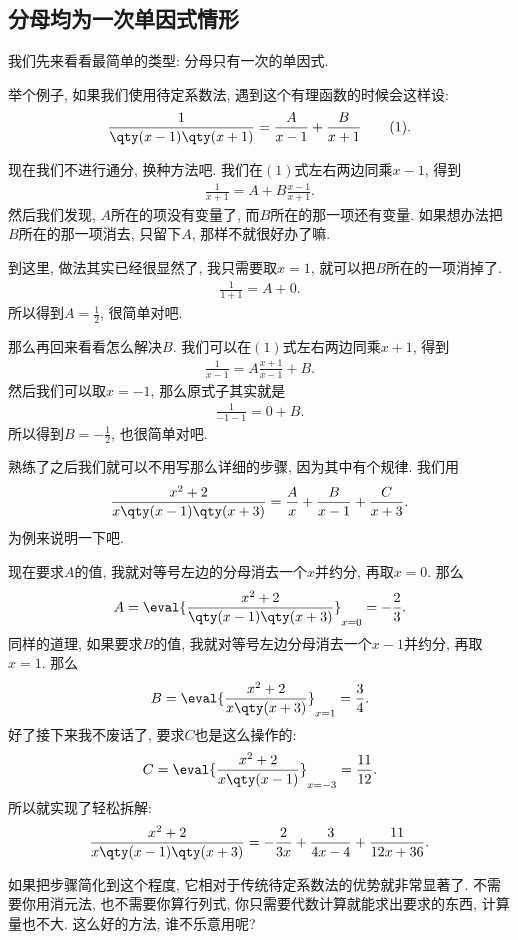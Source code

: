 \documentclass{ctexbook}
\begin{document}
{\subsection{分母均为一次单因式情形}
我们先来看看最简单的类型: 分母只有一次的单因式. \par
举个例子, 如果我们使用待定系数法, 遇到这个有理函数的时候会这样设: 
\begin{align*}
\frac{1}{\qty(x-1)\qty(x+1)}=\frac{A}{x-1}+\frac{B}{x+1}\tag{1}
.\end{align*}\par
现在我们不进行通分, 换种方法吧. 我们在$(1)$式左右两边同乘$x-1$, 得到
\begin{align*}
\frac{1}{x+1}=A+B\frac{x-1}{x+1}
.\end{align*}
然后我们发现, $A$所在的项没有变量了, 而$B$所在的那一项还有变量. 如果想办法把$B$所在的那一项消去, 只留下$A$, 那样不就很好办了嘛. \par
到这里, 做法其实已经很显然了, 我只需要取$x=1$, 就可以把$B$所在的一项消掉了. 
\begin{align*}
\frac{1}{1+1}=A+0
.\end{align*}
所以得到$A=\frac{1}{2}$, 很简单对吧. \par
那么再回来看看怎么解决$B$. 我们可以在$(1)$式左右两边同乘$x+1$, 得到
\begin{align*}
\frac{1}{x-1}=A\frac{x+1}{x-1}+B
.\end{align*}
然后我们可以取$x=-1$, 那么原式子其实就是
\begin{align*}
\frac{1}{-1-1}=0+B
.\end{align*}
所以得到$B=-\frac{1}{2}$, 也很简单对吧. \par
熟练了之后我们就可以不用写那么详细的步骤, 因为其中有个规律. 我们用
\begin{align*}
\frac{x^{2}+2}{x\qty(x-1)\qty(x+3)}=\frac{A}{x}+\frac{B}{x-1}+\frac{C}{x+3}
.\end{align*}
为例来说明一下吧. \par
现在要求$A$的值, 我就对等号左边的分母消去一个$x$并约分, 再取$x=0$. 那么
\begin{align*}
A=\eval{\frac{x^{2}+2}{\qty(x-1)\qty(x+3)}}_{x=0}=-\frac{2}{3}
.\end{align*}
同样的道理, 如果要求$B$的值, 我就对等号左边分母消去一个$x-1$并约分, 再取$x=1$. 那么
\begin{align*}
B=\eval{\frac{x^{2}+2}{x\qty(x+3)}}_{x=1}=\frac{3}{4}
.\end{align*}
好了接下来我不废话了, 要求$C$也是这么操作的: 
\begin{align*}
C=\eval{\frac{x^{2}+2}{x\qty(x-1)}}_{x=-3}=\frac{11}{12}
.\end{align*}
所以就实现了轻松拆解: 
\begin{align*}
\frac{x^{2}+2}{x\qty(x-1)\qty(x+3)}=-\frac{2}{3x}+\frac{3}{4x-4}+\frac{11}{12x+36}
.\end{align*}\par
如果把步骤简化到这个程度, 它相对于传统待定系数法的优势就非常显著了. 不需要你用消元法, 也不需要你算行列式, 你只需要代数计算就能求出要求的东西, 计算量也不大. 这么好的方法, 谁不乐意用呢? \par
}
\end{document}
